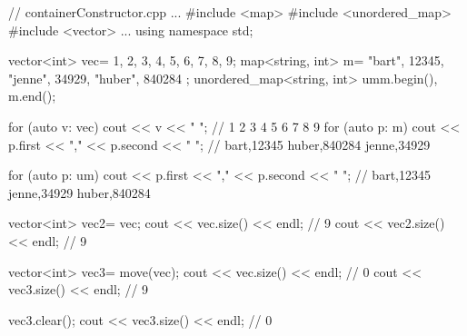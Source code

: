 
\begin{cpp}
// containerConstructor.cpp
...
#include <map>
#include <unordered_map>
#include <vector>
...
using namespace std;

vector<int> vec= {1, 2, 3, 4, 5, 6, 7, 8, 9};
map<string, int> m= {{"bart", 12345}, {"jenne", 34929}, {"huber", 840284} };
unordered_map<string, int> um{m.begin(), m.end()};

for (auto v: vec) cout << v << " "; // 1 2 3 4 5 6 7 8 9
for (auto p: m) cout << p.first << "," << p.second << " ";
// bart,12345 huber,840284 jenne,34929

for (auto p: um) cout << p.first << "," << p.second << " ";
// bart,12345 jenne,34929 huber,840284

vector<int> vec2= vec;
cout << vec.size() << endl; // 9
cout << vec2.size() << endl; // 9

vector<int> vec3= move(vec);
cout << vec.size() << endl; // 0
cout << vec3.size() << endl; // 9

vec3.clear();
cout << vec3.size() << endl; // 0
\end{cpp}















